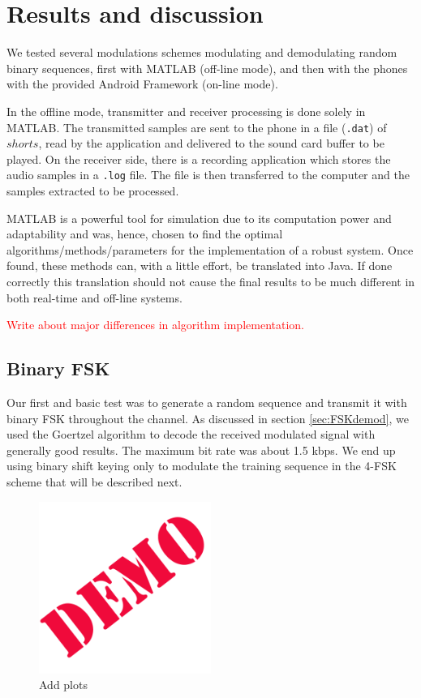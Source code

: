 \documentclass[12pt,a4paper,openright]{report}
\begin{document}


\chapter{Results and discussion}
We tested several modulations schemes modulating and demodulating random binary sequences, first with MATLAB (off-line mode), and then with the phones with the provided Android Framework (on-line mode). 

In the offline mode, transmitter and receiver processing is done solely in MATLAB. The transmitted samples are sent to the phone in a file (\texttt{.dat}) of $shorts$, read by the application and delivered to the sound card buffer to be played. On the receiver side, there is a recording application which stores the audio samples in a \texttt{.log} file. The file is then transferred to the computer and the samples extracted to be processed. 

MATLAB is a powerful tool for simulation due to its computation power and adaptability and was, hence, chosen to find the optimal algorithms/methods/parameters for the implementation of a robust system. Once found, these methods can, with a little effort, be translated into Java. If done correctly this translation should not cause the final results to be much different in both real-time and off-line systems. 

\textcolor{red}{Write about major differences in algorithm implementation.}%
\section{Binary FSK}
Our first and basic test was to generate a random sequence and transmit it with binary FSK throughout the channel. As discussed in section \ref{sec:FSKdemod}, we used the Goertzel algorithm to decode the received modulated signal with generally good results. The maximum bit rate was about 1.5 kbps. We end up using binary shift keying only to modulate the training sequence in the 4-FSK scheme that will be described next. 

\begin{figure}[H]
  \centering
    \includegraphics[width=0.5\textwidth]{demo.png}
    \caption[Add caption]{Add plots}
    \label{fig:4FSKplots}
\end{figure}
\end{document}
